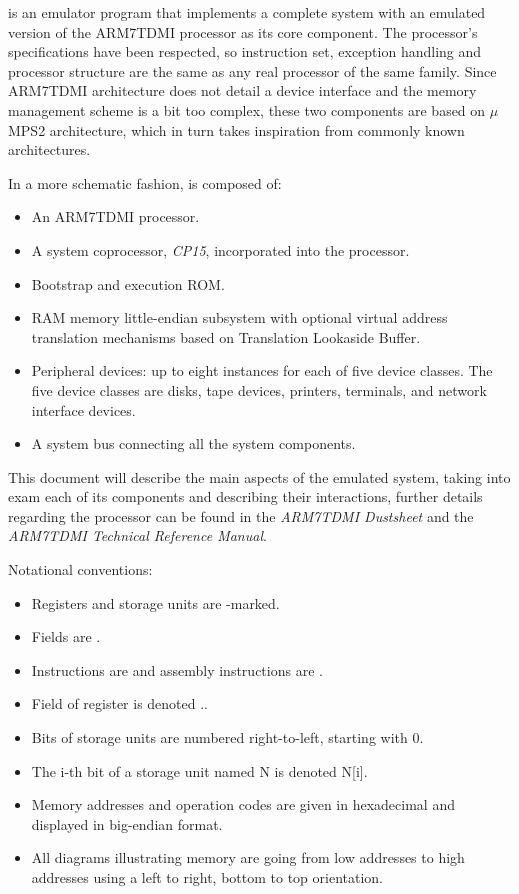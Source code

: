 
\uarm{} is an emulator program that implements a complete system with an emulated version of the ARM7TDMI processor as its core component.
The processor's specifications have been respected, so instruction set, exception handling and processor structure are the same as any real processor of the same family.
Since ARM7TDMI architecture does not detail a device interface and the memory management scheme is a bit too complex, these two components are based on $\mu$MPS2 architecture, which in turn takes inspiration from commonly known architectures.

In a more schematic fashion, \uarm{} is composed of:
\begin{itemize}
	\item An ARM7TDMI processor.
	\item A system coprocessor, \emph{CP15}, incorporated into the processor.
	\item Bootstrap and execution ROM.
	\item RAM memory little-endian subsystem with optional virtual address translation mechanisms based on Translation Lookaside Buffer.
	\item Peripheral devices: up to eight instances for each of five device classes. 
		The five device classes are disks, tape devices, printers, terminals, and network interface devices.
	\item A system bus connecting all the system components.
\end{itemize}

This document will describe the main aspects of the emulated system, taking into exam each of its components and describing their interactions, further details regarding the processor can be found in the \emph{ARM7TDMI Dustsheet} and the \emph{ARM7TDMI Technical Reference Manual}.

Notational conventions:

\begin{itemize}
	\item Registers and storage units are -marked.
	\item Fields are .
	\item Instructions are  and assembly instructions are .
	\item Field  of register  is denoted ..
	\item Bits of storage units are numbered right-to-left, starting with 0.
	\item The i-th bit of a storage unit named N is denoted N[i].
	\item Memory addresses and operation codes are given in hexadecimal and displayed in big-endian format.
	\item All diagrams illustrating memory are going from low addresses to high addresses using a left to right, bottom to top orientation.
\end{itemize}


